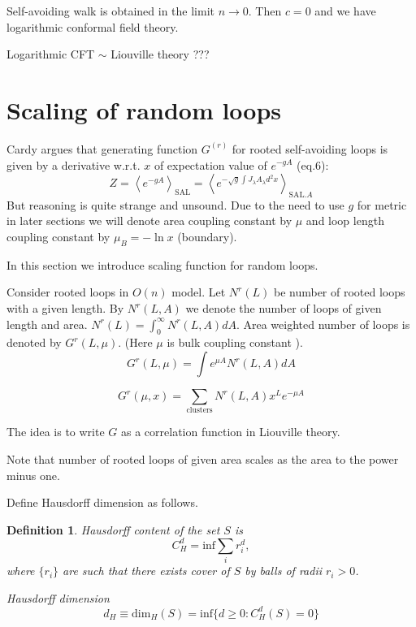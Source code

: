\documentclass[12pt]{article}
\newtheorem{definition}{Definition}
\begin{document}
Self-avoiding walk is obtained in the limit $n\to 0$. Then $c=0$ and
we have logarithmic conformal field theory. 

Logarithmic CFT $\sim$ Liouville theory ???

\section{Scaling of random loops}
\label{sec:scaling-random-loops}

Cardy \cite{cardy2001exact} argues that generating function $G^{(r)}$ for rooted self-avoiding loops is given by a derivative w.r.t. $x$
of expectation value of $e^{-gA}$ (eq.6):
\begin{equation}
  \label{eq:82}
  Z=\left<e^{-gA}\right>_{\mathrm{SAL}}=\left<e^{-\sqrt{g}\int J_{\lambda}A_{\lambda}d^{2}x}\right>_{\mathrm{SAL}.A}
\end{equation}
But reasoning is quite strange and unsound. Due to the need to use $g$ for metric in later sections
we will denote area coupling constant by $\mu$ and loop length coupling constant by $\mu_{B}=-\ln x$
(boundary). 


In this section we introduce scaling function for random loops. 

Consider rooted loops in $O(n)$ model. Let $N^r(L)$ be number of
rooted loops with a given length.  By $N^r(L,A)$ we denote the number
of loops of given length and area. $N^r(L)=\int_0^{\infty} N^r(L,A)
dA$. Area weighted number of loops is denoted by $G^r(L,\mu)$. (Here
$\mu$ is bulk coupling constant ).
\begin{equation}
  \label{eq:2}
  G^r(L,\mu)=\int e^{\mu A} N^r(L,A) dA
\end{equation}

\begin{equation}
  \label{eq:1}
  G^r (\mu,x) = \sum_{\mathrm{clusters}} N^r (L,A) x^L e^{-\mu A}
\end{equation}

The idea is to write $G$ as a correlation function in Liouville
theory.

Note that number of rooted loops of given area scales as the area to
the power minus one. 

Define Hausdorff dimension as follows.
\begin{definition}
  {\it Hausdorff content} of the set $S$ is
  \begin{equation}
    \label{eq:3}
    C^d_H = \mathrm{inf} \sum_i r_i^d,
  \end{equation}
  where $\{r_i\}$ are such that there exists cover of $S$ by balls of
  radii $r_i>0$. 

  {\it Hausdorff dimension}
  \begin{equation}
    \label{eq:4}
    d_H\equiv\mathrm{dim}_H(S) = \mathrm{inf}\{ d\geq 0: C^d_H(S)=0\}
  \end{equation}
\end{definition}
\end{document}

